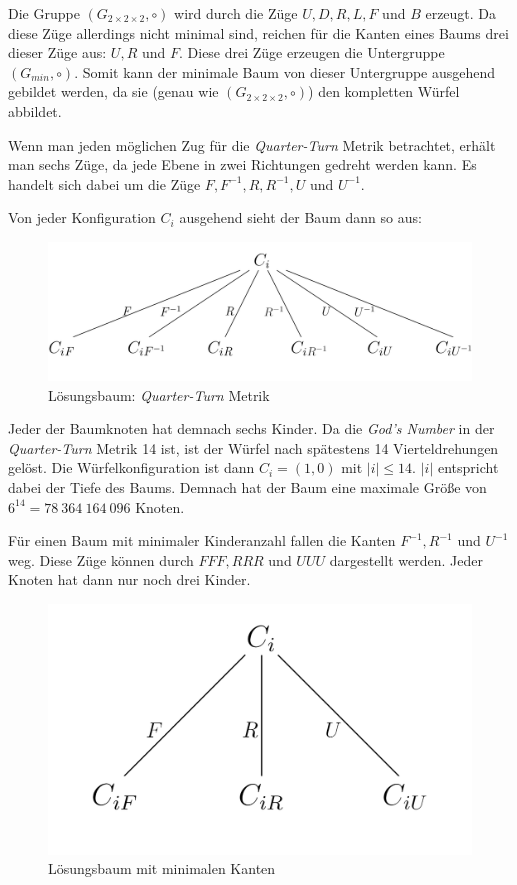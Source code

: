 \documentclass[12pt,a4paper, usenames, dvipsnames]{article}
\theoremstyle{mystyle}
\theoremstyle{definition}
\newcommand{\Gtwo}{\ensuremath{G_{2\times 2\times 2}}}
\begin{document}
Die Gruppe $(\Gtwo, \circ)$ wird durch die Züge $U, D, R, L, F$ und $B$ erzeugt. Da diese Züge allerdings nicht minimal sind, reichen für die Kanten eines Baums drei dieser Züge aus: $U, R$ und $F$. Diese drei Züge erzeugen die Untergruppe $(G_{min}, \circ)$. Somit kann der minimale Baum von dieser Untergruppe ausgehend gebildet werden, da sie (genau wie $(\Gtwo, \circ)$) den kompletten Würfel abbildet.

Wenn man jeden möglichen Zug für die \textit{Quarter-Turn} Metrik betrachtet, erhält man sechs Züge, da jede Ebene in zwei Richtungen gedreht werden kann. Es handelt sich dabei um die Züge $F, F^{-1}, R, R^{-1}, U$ und $U^{-1}$.

Von jeder Konfiguration $C_i$ ausgehend sieht der Baum dann so aus:

\begin{figure}[H]
\centering
\includegraphics[scale=1.5]{Baum_1.jpg}
\caption{Lösungsbaum: \textit{Quarter-Turn} Metrik}
\label{Abbildung_BaumQTM}
\end{figure}

Jeder der Baumknoten hat demnach sechs Kinder. Da die \textit{God's Number} in der \textit{Quarter-Turn} Metrik 14 ist, ist der Würfel nach spätestens 14 Vierteldrehungen gelöst. Die Würfelkonfiguration ist dann $C_i = (1, 0)$ mit $|i| \leq 14$. $|i|$ entspricht dabei der Tiefe des Baums. Demnach hat der Baum eine maximale Größe von $6^{14} = 78 \ 364 \ 164 \ 096$ Knoten.

Für einen Baum mit minimaler Kinderanzahl fallen die Kanten $F^{-1}, R^{-1}$ und $U^{-1}$ weg. Diese Züge können durch $FFF, RRR$ und $UUU$ dargestellt werden. Jeder Knoten hat dann nur noch drei Kinder. 

\begin{figure}[H]
\centering
\includegraphics[scale=0.45]{Baum_2.jpg}
\caption{Lösungsbaum mit minimalen Kanten}
\label{Abbildung_BaumMin}
\end{figure}
\end{document}
